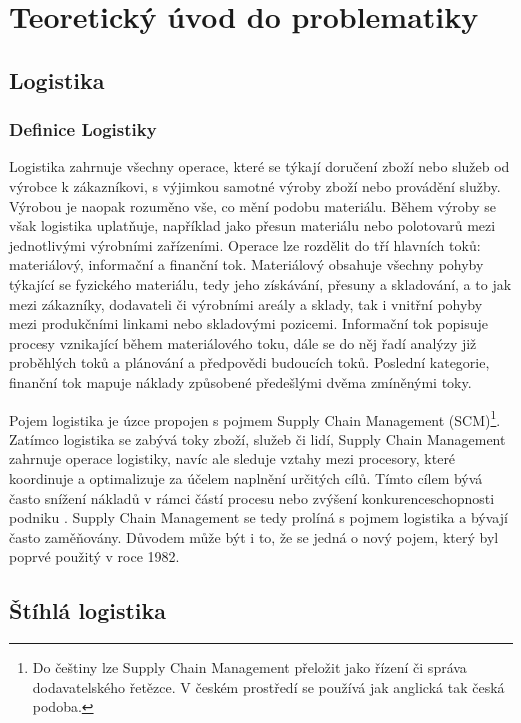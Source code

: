 \chapter{Teoretický úvod do problematiky}

\section{Logistika}

\subsection{Definice Logistiky}

Logistika zahrnuje všechny operace, které se týkají doručení zboží nebo služeb od výrobce k zákazníkovi, s výjimkou samotné výroby zboží nebo provádění služby. Výrobou je naopak rozuměno vše, co mění podobu materiálu.
Během výroby se však logistika uplatňuje, například jako přesun materiálu nebo polotovarů mezi jednotlivými výrobními zařízeními. 
Operace lze rozdělit do tří hlavních toků: materiálový, informační a finanční tok. Materiálový obsahuje všechny pohyby týkající se fyzického materiálu, tedy jeho získávání, přesuny a skladování, a to jak mezi zákazníky, dodavateli či výrobními areály a sklady, tak i vnitřní pohyby mezi produkčními linkami nebo skladovými pozicemi. Informační tok popisuje procesy vznikající během materiálového toku, dále se do něj řadí analýzy již proběhlých toků a plánování a předpovědi budoucích toků. Poslední kategorie, finanční tok mapuje náklady způsobené předešlými dvěma zmíněnými toky.\cite{bib:Baudin}

Pojem logistika je úzce propojen s pojmem Supply Chain Management (SCM)\footnote{Do češtiny lze Supply Chain Management přeložit jako řízení či správa dodavatelského řetězce. V českém prostředí se používá jak anglická tak česká podoba.}. Zatímco logistika se zabývá toky zboží, služeb či lidí, Supply Chain Management zahrnuje operace logistiky, navíc ale sleduje vztahy mezi procesory, které koordinuje a optimalizuje za účelem naplnění určitých cílů. Tímto cílem bývá často snížení nákladů v rámci částí procesu nebo zvýšení konkurenceschopnosti podniku \cite{bib:IIMudaipur}. Supply Chain Management se tedy prolíná s pojmem logistika a bývají často zaměňovány. Důvodem může být i to, že se jedná o nový pojem, který byl poprvé použitý v roce 1982.\cite{bib:Christopher} 

\section{Štíhlá logistika}

